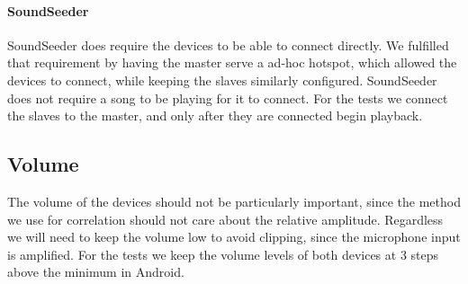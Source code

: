 \paragraph{SoundSeeder}
SoundSeeder does require the devices to be able to connect directly. We
fulfilled that requirement by having the master serve a ad-hoc hotspot,
which allowed the devices to connect, while keeping the slaves
similarly configured. SoundSeeder does not require a song to be playing
for it to connect. For the tests we connect the slaves to the master,
and only after they are connected begin playback.

\subsection{Volume}
The volume of the devices should not be particularly important, since
the method we use for correlation should not care about the relative
amplitude. Regardless we will need to keep the volume low to avoid
clipping, since the microphone input is amplified. For the tests we keep
the volume levels of both devices at 3 steps above the minimum in
Android.

